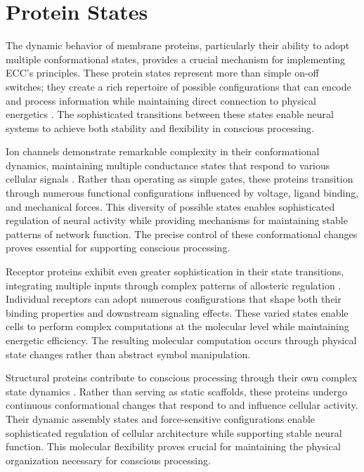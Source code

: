 \section{Protein States}

The dynamic behavior of membrane proteins, particularly their ability to adopt multiple conformational states, provides a crucial mechanism for implementing ECC's principles. These protein states represent more than simple on-off switches; they create a rich repertoire of possible configurations that can encode and process information while maintaining direct connection to physical energetics \cite{Balchin2016}. The sophisticated transitions between these states enable neural systems to achieve both stability and flexibility in conscious processing.

Ion channels demonstrate remarkable complexity in their conformational dynamics, maintaining multiple conductance states that respond to various cellular signals \cite{Henzler-Wildman2007}. Rather than operating as simple gates, these proteins transition through numerous functional configurations influenced by voltage, ligand binding, and mechanical forces. This diversity of possible states enables sophisticated regulation of neural activity while providing mechanisms for maintaining stable patterns of network function. The precise control of these conformational changes proves essential for supporting conscious processing.

Receptor proteins exhibit even greater sophistication in their state transitions, integrating multiple inputs through complex patterns of allosteric regulation \cite{Nussinov2013}. Individual receptors can adopt numerous configurations that shape both their binding properties and downstream signaling effects. These varied states enable cells to perform complex computations at the molecular level while maintaining energetic efficiency. The resulting molecular computation occurs through physical state changes rather than abstract symbol manipulation.

Structural proteins contribute to conscious processing through their own complex state dynamics \cite{Frauenfelder2009}. Rather than serving as static scaffolds, these proteins undergo continuous conformational changes that respond to and influence cellular activity. Their dynamic assembly states and force-sensitive configurations enable sophisticated regulation of cellular architecture while supporting stable neural function. This molecular flexibility proves crucial for maintaining the physical organization necessary for conscious processing.

